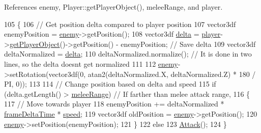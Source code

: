 References enemy, Player\-::get\-Player\-Object(), melee\-Range, and player.


\begin{DoxyCode}
105 \{
106     \textcolor{comment}{// Get position delta compared to player position}
107     vector3df enemyPosition = \hyperlink{class_enemy_a4befe0ced393215de590152256bf1ee4}{enemy}->getPosition();
108     vector3df \hyperlink{class_enemy_a2aeaae8acd857242e40db8b034566351}{delta} = \hyperlink{_enemy_8cpp_a96781128d3743da3d17e0fdd91afba7b}{player}->\hyperlink{class_player_a2914f817c2fe9b34984e6d90e8d5322f}{getPlayerObject}()->getPosition() - enemyPosition; \textcolor{comment}{
      // Save delta}
109     vector3df deltaNormalized = \hyperlink{class_enemy_a2aeaae8acd857242e40db8b034566351}{delta};
110     deltaNormalized.normalize(); \textcolor{comment}{// It is done in two lines, so the delta doesnt get normalized}
111 
112     \hyperlink{class_enemy_a4befe0ced393215de590152256bf1ee4}{enemy}->setRotation(vector3df(0, atan2(deltaNormalized.X, deltaNormalized.Z) * 180 / PI, 0));
113 
114     \textcolor{comment}{// Change position based on delta and speed}
115     \textcolor{keywordflow}{if} (delta.getLength() > \hyperlink{_enemy_8cpp_aeb6b022a3bc50999e6ab66b83fc9cb4d}{meleeRange}) \textcolor{comment}{// If farther than melee attack range,}
116     \{
117         \textcolor{comment}{// Move towards player}
118         enemyPosition += deltaNormalized * \hyperlink{_player_8cpp_adc988571147642cda93afbf89783f9c9}{frameDeltaTime} * \hyperlink{class_enemy_a98766d083fc49e746a37d0dc69be09e0}{speed};
119         vector3df oldPosition = \hyperlink{class_enemy_a4befe0ced393215de590152256bf1ee4}{enemy}->getPosition();
120         \hyperlink{class_enemy_a4befe0ced393215de590152256bf1ee4}{enemy}->setPosition(enemyPosition);
121     \}
122     \textcolor{keywordflow}{else}
123         \hyperlink{class_enemy_a9d077112e9af9e0bf92aa73ec20ea6ae}{Attack}();
124 \}
\end{DoxyCode}


